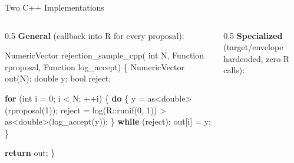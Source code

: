 \documentclass[
  ignorenonframetext,
]{beamer}
\newenvironment{Shaded}{\begin{snugshade}}{\end{snugshade}}
\newcommand{\ControlFlowTok}[1]{\textcolor[rgb]{0.00,0.23,0.31}{\textbf{#1}}}
\newcommand{\DataTypeTok}[1]{\textcolor[rgb]{0.68,0.00,0.00}{#1}}
\newcommand{\DecValTok}[1]{\textcolor[rgb]{0.68,0.00,0.00}{#1}}
\newcommand{\NormalTok}[1]{\textcolor[rgb]{0.00,0.23,0.31}{#1}}
\newcommand{\OperatorTok}[1]{\textcolor[rgb]{0.37,0.37,0.37}{#1}}
\begin{document}
\begin{frame}[fragile]{Two C++ Implementations}
\protect{}\label{two-c-implementations}
\tiny

\begin{columns}[T]
\begin{column}{0.5\linewidth}
\textbf{General} (callback into R for every proposal):

\begin{Shaded}
\begin{Highlighting}[]
\NormalTok{NumericVector rejection\_sample\_cpp}\OperatorTok{(}
    \DataTypeTok{int}\NormalTok{ N}\OperatorTok{,}\NormalTok{ Function rproposal}\OperatorTok{,}\NormalTok{ Function log\_accept}\OperatorTok{)} \OperatorTok{\{}
\NormalTok{  NumericVector out}\OperatorTok{(}\NormalTok{N}\OperatorTok{);}
  \DataTypeTok{double}\NormalTok{ y}\OperatorTok{;}
  \DataTypeTok{bool}\NormalTok{ reject}\OperatorTok{;}

  \ControlFlowTok{for} \OperatorTok{(}\DataTypeTok{int}\NormalTok{ i }\OperatorTok{=} \DecValTok{0}\OperatorTok{;}\NormalTok{ i }\OperatorTok{\textless{}}\NormalTok{ N}\OperatorTok{;} \OperatorTok{++}\NormalTok{i}\OperatorTok{)} \OperatorTok{\{}
    \ControlFlowTok{do} \OperatorTok{\{}
\NormalTok{      y }\OperatorTok{=}\NormalTok{ as}\OperatorTok{\textless{}}\DataTypeTok{double}\OperatorTok{\textgreater{}(}\NormalTok{rproposal}\OperatorTok{(}\DecValTok{1}\OperatorTok{));}
\NormalTok{      reject }\OperatorTok{=}\NormalTok{ log}\OperatorTok{(}\NormalTok{R}\OperatorTok{::}\NormalTok{runif}\OperatorTok{(}\DecValTok{0}\OperatorTok{,} \DecValTok{1}\OperatorTok{))} \OperatorTok{\textgreater{}}
\NormalTok{        as}\OperatorTok{\textless{}}\DataTypeTok{double}\OperatorTok{\textgreater{}(}\NormalTok{log\_accept}\OperatorTok{(}\NormalTok{y}\OperatorTok{));}
    \OperatorTok{\}} \ControlFlowTok{while} \OperatorTok{(}\NormalTok{reject}\OperatorTok{);}
\NormalTok{    out}\OperatorTok{[}\NormalTok{i}\OperatorTok{]} \OperatorTok{=}\NormalTok{ y}\OperatorTok{;}
  \OperatorTok{\}}

  \ControlFlowTok{return}\NormalTok{ out}\OperatorTok{;}
\OperatorTok{\}}
\end{Highlighting}
\end{Shaded}
\end{column}

\begin{column}{0.5\linewidth}
\textbf{Specialized} (target/envelope hardcoded, zero R calls):


\end{column}
\end{columns}
\end{frame}
\end{document}
